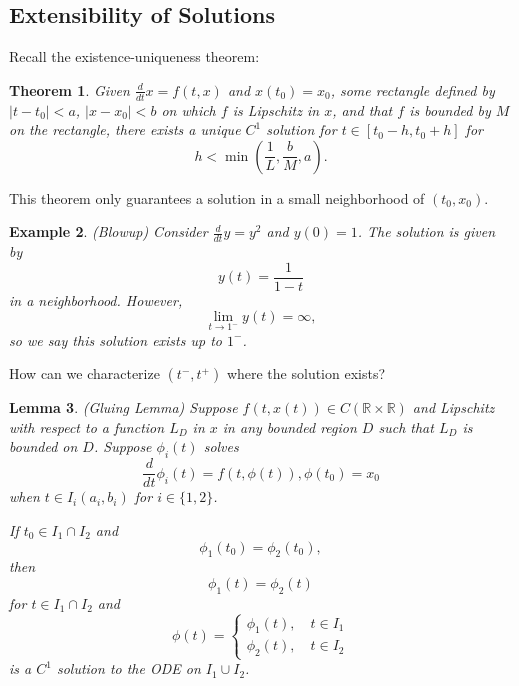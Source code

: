 \documentclass{tufte-handout}
\newcommand*\R{\mathbb{R}}
\newtheorem{thm}{Theorem}[subsection]
\newtheorem{lemma}[thm]{Lemma}
\newtheorem{ex}[thm]{Example}
\theoremstyle{definition}
\begin{document}
\subsection{Extensibility of Solutions}

Recall the existence-uniqueness theorem:

\begin{thm}
	Given $\frac{d}{dt} x = f(t,x)$ and $x(t_0) = x_0$, some rectangle defined by $\left| t-t_0 \right|<a$, $\left| x-x_0 \right|<b$ on which $f$ is Lipschitz in $x$, and that $f$ is bounded by $M$ on the rectangle, there exists a unique $C^1$ solution for $t \in [t_0-h, t_0+h]$ for \[
		h < \min(\frac{1}{L}, \frac{b}{M}, a)
	.\] 
\end{thm}

This theorem only guarantees a solution in a small neighborhood of $(t_0,x_0)$. 

\begin{ex}
	(Blowup) Consider $\frac{d}{dt} y = y^2$ and $y(0) = 1$. The solution is given by \[
		y(t) = \frac{1}{1-t}
	\] in a neighborhood. However, \[
		\lim\limits_{t \to 1^-} y(t) = \infty
	,\] so we say this solution exists up to $1^-$.
\end{ex}

How can we characterize $(t^-, t^+)$ where the solution exists?

\begin{lemma}
	(Gluing Lemma) Suppose $f(t,x(t)) \in C(\R \times \R)$ and Lipschitz with respect to a function $L_D$ in $x$ in any bounded region $D$ such that $L_D$ is bounded on $D$. Suppose $\phi_i(t)$ solves \[
		\frac{d}{dt}\phi_i(t) = f(t,\phi(t)), \phi(t_0) = x_0
	\] when $t \in I_i (a_i,b_i)$ for $i \in \{1,2\}$.

	If $t_0 \in I_1 \cap I_2$ and \[
		\phi_1(t_0) = \phi_2(t_0)
	,\] then \[
		\phi_1(t) = \phi_2(t)
	\] for $t \in I_1 \cap  I_2$ and \[
		\phi(t) = \begin{cases}
			\phi_1(t),\quad t \in I_1 \\
			\phi_2(t), \quad t\in I_2
		\end{cases}
	\] is a $C^1$ solution to the ODE on $I_1 \cup I_2$.
\end{lemma}
\end{document}
